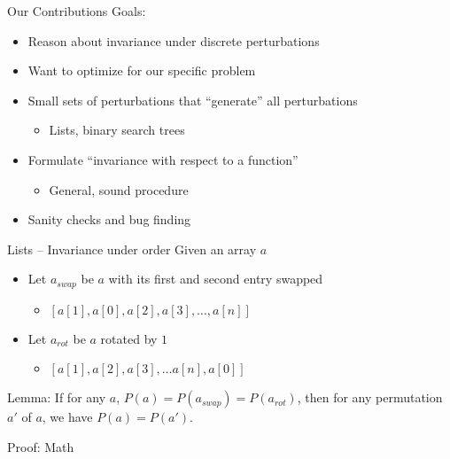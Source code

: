 \documentclass[usenames,dvipsnames]{beamer}
\begin{document}
\begin{frame}[fragile]{Our Contributions}
  Goals:
  \begin{itemize}
      \item Reason about invariance under discrete perturbations
      \item Want to optimize for our specific problem
  \end{itemize}
      \vfill
  \begin{itemize}
      \item Small sets of perturbations that ``generate'' all perturbations
      \begin{itemize}
        \item Lists, binary search trees
      \end{itemize}
      \item Formulate ``invariance with respect to a function''
      \begin{itemize}
        \item General, sound procedure
      \end{itemize}
      \item Sanity checks and bug finding
  \end{itemize}
\end{frame}

\begin{frame}[fragile]{Lists -- Invariance under order}
  Given an array $a$
  \begin{itemize}
    \item Let $a_{swap}$ be $a$ with its first and second entry swapped
    \begin{itemize}
      \item $[ a[1], a[0], a[2], a[3], \ldots, a[n] ]$
    \end{itemize}
    \item Let $a_{rot}$ be $a$ rotated by $1$
    \begin{itemize}
      \item $[ a[1], a[2], a[3], \ldots  a[n], a[0] ]$
    \end{itemize}
  \end{itemize}
  \vfill
  Lemma: If for any $a$, $P(a) = P(a_{swap}) = P(a_{rot})$,
  then for any permutation $a'$ of $a$,
  we have $P(a) = P(a')$.

  Proof: Math \cite{dummitfoote}
\end{frame}
\end{document}
